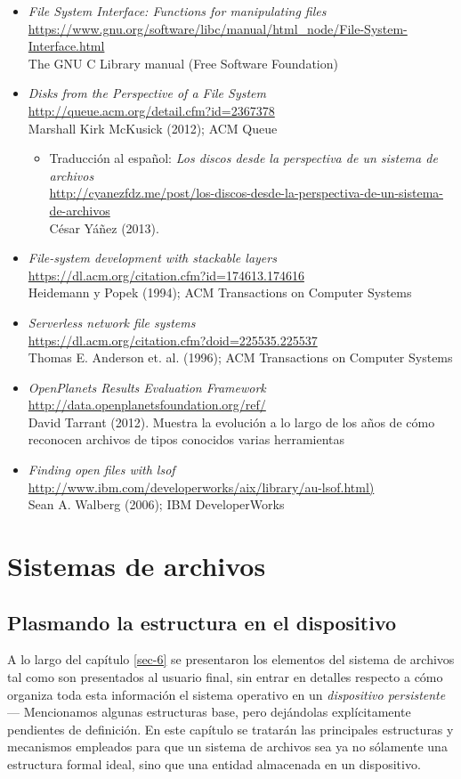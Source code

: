 \documentclass[11pt,fleqn]{book} %
\newcommand{\otrorec}[1]{ \\ {\small \url{#1}} \\ }
\begin{document}
\begin{itemize}
\item \emph{File System Interface: Functions for manipulating files}
  \otrorec{https://www.gnu.org/software/libc/manual/html_node/File-System-Interface.html}
  The GNU C Library manual (Free Software Foundation)
\item \emph{Disks from the Perspective of a File System}
  \otrorec{http://queue.acm.org/detail.cfm?id=2367378}
  Marshall Kirk McKusick
  (2012); ACM Queue
\begin{itemize}
\item Traducción al español: \emph{Los discos desde la perspectiva de un     sistema de archivos}
    \otrorec{http://cyanezfdz.me/post/los-discos-desde-la-perspectiva-de-un-sistema-de-archivos}
    César Yáñez (2013).
\end{itemize}
\item \emph{File-system development with stackable layers}
  \otrorec{https://dl.acm.org/citation.cfm?id=174613.174616}
  Heidemann y
  Popek (1994); ACM Transactions on Computer Systems
\item \emph{Serverless network file systems}
  \otrorec{https://dl.acm.org/citation.cfm?doid=225535.225537}
  Thomas
  E. Anderson et. al. (1996); ACM Transactions on Computer Systems
\item \emph{OpenPlanets Results Evaluation Framework}
  \otrorec{http://data.openplanetsfoundation.org/ref/}
  David Tarrant
  (2012). Muestra la evolución a lo largo de los años de cómo
  reconocen archivos de tipos conocidos varias herramientas
\item \emph{Finding open files with lsof}
  \otrorec{http://www.ibm.com/developerworks/aix/library/au-lsof.html)}
  Sean A. Walberg (2006); IBM DeveloperWorks
\end{itemize}
\chapter{Sistemas de archivos}
\label{sec-7}
\section{Plasmando la estructura en el dispositivo}
\label{sec-7-1}
\label{FS}


A lo largo del capítulo \ref{sec-6} se presentaron los elementos del sistema de archivos tal
como son presentados al usuario final, sin entrar en detalles respecto
a cómo organiza toda esta información el sistema operativo en un
\emph{dispositivo persistente} — Mencionamos algunas estructuras base, pero
dejándolas explícitamente pendientes de definición. En este capítulo
se tratarán las principales estructuras y mecanismos
empleados para que un sistema de archivos sea ya no sólamente una
estructura formal ideal, sino que una entidad almacenada en un dispositivo.
\end{document}
